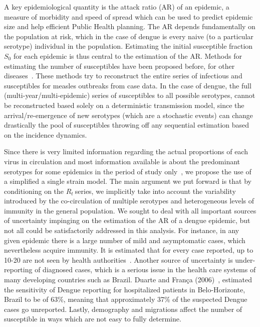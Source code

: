 \documentclass[10pt]{article}
\def \rr {$R_{t}\:$}
\begin{document}
A key epidemiological quantity is the attack ratio (AR) of an epidemic, a 
measure of morbidity and speed of spread which can be used to predict epidemic 
size and help efficient Public Health planning.
The AR depends fundamentally on the population at risk, which in the case of 
dengue is every naive (to a particular serotype) individual in the population.
Estimating the initial susceptible fraction $S_0$ for each epidemic is thus 
central to the estimation of the AR.
Methods for estimating the  number of susceptibles have been proposed 
before, for other diseases~\citep{bjornstad_dynamics_2002, 
wallinga_reconstruction_2003}.
These methods try to reconstruct the entire 
series of infectious and susceptibles for measles 
outbreaks from case data.
In the case of dengue, the full (multi-year/multi-epidemic)
series of susceptibles to all possible serotypes, cannot be reconstructed based 
solely on a deterministic transmission model, since the arrival/re-emergence of 
new serotypes (which are a stochastic events) can change drastically the pool 
of susceptibles throwing off any sequential estimation based on the incidence
dynamics.

Since there is very limited information regarding the actual proportions of 
each virus in circulation and most information available is about the 
predominant serotypes for some epidemics in the period of 
study only~\citep{macedo_virological_2013}, we propose the use of a 
simplified a single strain model.
The main argument we put forward is that by conditioning on the \rr series, we 
implicitly take into account the variability introduced by the 
co-circulation of multiple serotypes and heterogeneous levels of immunity in 
the general population.
We sought to deal with all important sources of uncertainty impinging on the 
estimation of the AR of a dengue epidemic, but not all could be satisfactorily 
addressed in this analysis.
For instance, in any given epidemic there is a large number of 
mild and asymptomatic cases, which nevertheless acquire immunity.
It is estimated that for every case reported, up to 10-20 are not seen by health 
authorities~\citep{luz_disability_2009}.
Another source of uncertainty is under-reporting of diagnosed cases, which is a 
serious issue in the health care systems of many developing countries such as 
Brazil. 
Duarte and Fran\c{c}a (2006)~\citep{duarte_data_2006}, estimated 
the sensitivity of Dengue reporting for hospitalized patients in 
Belo-Horizonte, Brazil to be of 63\%, meaning that approximately 37\% of the 
suspected Dengue cases go unreported.  
Lastly, demography and migrations affect the number of susceptible in ways 
which are not easy to fully determine.
\end{document}
